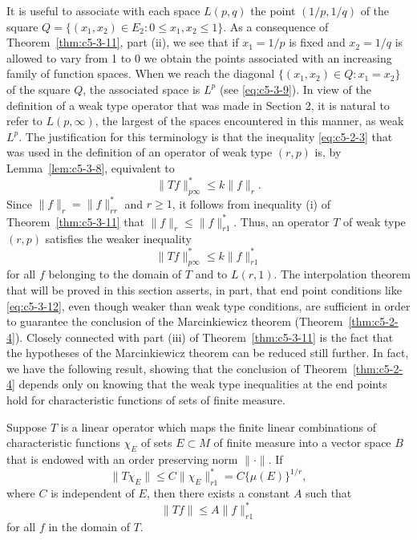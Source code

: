 It is useful to associate with each space $L(p, q)$ the point $(1/p, 1/q)$ of
the square $Q = \{(x_{1}, x_{2}) \in E_{2} : 0 \leq x_{1}, x_{2} \leq 1\}$. As
a consequence of Theorem~\ref{thm:c5-3-11}, part (ii), we see that if
$x_{1} = 1/p$ is fixed and $x_{2} = 1/q$ is allowed to vary from 1 to 0 we
obtain the points associated with an increasing family of function spaces. When
we reach the diagonal $\{(x_{1}, x_{2}) \in Q : x_{1} = x_{2}\}$ of the square
$Q$, the associated space is $L^{p}$ (see \eqref{eq:c5-3-9}). In view of the
definition of a weak type operator that was made in Section 2, it is natural to
refer to $L(p, \infty)$, the largest of the spaces encountered in this manner,
as weak $L^{p}$. The justification for this terminology is that the inequality
\eqref{eq:c5-2-3} that was used in the definition of an operator of weak type
$(r, p)$ is, by Lemma~\ref{lem:c5-3-8}, equivalent to
\[
\|Tf\|_{p\infty}^{*}\leq k\|f\|_{r}.
\]
Since $\|f\|_{r} = \|f\|_{rr}^{*}$ and $r \geq 1$, it follows from inequality
(i) of Theorem~\ref{thm:c5-3-11} that $\|f\|_{r} \leq \|f\|_{r1}^{*}$. Thus, an
operator $T$ of weak type $(r, p)$ satisfies the weaker inequality
\begin{equation}\label{eq:c5-3-12}
\|Tf\|_{p\infty}^{*}\leq k\|f\|_{r1}^{*}
\end{equation}
for all $f$ belonging to the domain of $T$ and to $L(r, 1)$. The interpolation
theorem that will be proved in this section asserts, in part, that end point
conditions like \eqref{eq:c5-3-12}, even though weaker than weak type
conditions, are sufficient in order to guarantee the conclusion of the
Marcinkiewicz theorem (Theorem~\ref{thm:c5-2-4}). Closely connected with part
(iii) of Theorem~\ref{thm:c5-3-11} is the fact that the hypotheses of the
Marcinkiewicz theorem can be reduced still further. In fact, we have the
following result, showing that the conclusion of Theorem~\ref{thm:c5-2-4}
depends only on knowing that the weak type inequalities at the end points hold
for characteristic functions of sets of finite measure.

\begin{theorem}\label{thm:c5-3-13}
Suppose $T$ is a linear operator which maps the finite linear combinations of
characteristic functions $\chi_{E}$ of sets $E \subset M$ of finite measure
into a vector space $B$ that is endowed with an order preserving norm
$\|\cdot\|$. If
\[
\|T\chi_{E}\|\leq C\|\chi_{E}\|_{r1}^{*}=C\{\mu(E)\}^{1/r},
\]
where $C$ is independent of $E$, then there exists a constant $A$ such that
\[
\|Tf\|\leq A\|f\|_{r1}^{*}
\]
for all $f$ in the domain of $T$.
\end{theorem}

